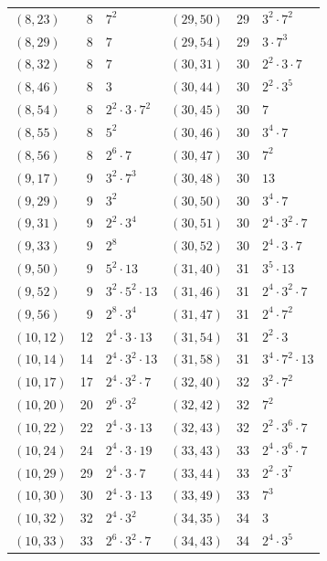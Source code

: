 \documentclass[11pt]{article}
\begin{document}
\begin{longtable}{@{}lrl@{\qquad}lrl@{}}
$(8,23)$ & 8 & $7^{2}$ & $(29,50)$ & 29 & $3^{2}\cdot 7^{2}$\\
$(8,29)$ & 8 & $7$ & $(29,54)$ & 29 & $3\cdot 7^{3}$\\
$(8,32)$ & 8 & $7$ & $(30,31)$ & 30 & $2^{2}\cdot 3\cdot 7$\\
$(8,46)$ & 8 & $3$ & $(30,44)$ & 30 & $2^{2}\cdot 3^{5}$\\
$(8,54)$ & 8 & $2^{2}\cdot 3\cdot 7^{2}$ & $(30,45)$ & 30 & $7$\\
$(8,55)$ & 8 & $5^{2}$ & $(30,46)$ & 30 & $3^{4}\cdot 7$\\
$(8,56)$ & 8 & $2^{6}\cdot 7$ & $(30,47)$ & 30 & $7^{2}$\\
$(9,17)$ & 9 & $3^{2}\cdot 7^{3}$ & $(30,48)$ & 30 & $13$\\
$(9,29)$ & 9 & $3^{2}$ & $(30,50)$ & 30 & $3^{4}\cdot 7$\\
$(9,31)$ & 9 & $2^{2}\cdot 3^{4}$ & $(30,51)$ & 30 & $2^{4}\cdot 3^{2}\cdot 7$\\
$(9,33)$ & 9 & $2^{8}$ & $(30,52)$ & 30 & $2^{4}\cdot 3\cdot 7$\\
$(9,50)$ & 9 & $5^{2}\cdot 13$ & $(31,40)$ & 31 & $3^{5}\cdot 13$\\
$(9,52)$ & 9 & $3^{2}\cdot 5^{2}\cdot 13$ & $(31,46)$ & 31 & $2^{4}\cdot 3^{2}\cdot 7$\\
$(9,56)$ & 9 & $2^{8}\cdot 3^{4}$ & $(31,47)$ & 31 & $2^{4}\cdot 7^{2}$\\
$(10,12)$ & 12 & $2^{4}\cdot 3\cdot 13$ & $(31,54)$ & 31 & $2^{2}\cdot 3$\\
$(10,14)$ & 14 & $2^{4}\cdot 3^{2}\cdot 13$ & $(31,58)$ & 31 & $3^{4}\cdot 7^{2}\cdot 13$\\
$(10,17)$ & 17 & $2^{4}\cdot 3^{2}\cdot 7$ & $(32,40)$ & 32 & $3^{2}\cdot 7^{2}$\\
$(10,20)$ & 20 & $2^{6}\cdot 3^{2}$ & $(32,42)$ & 32 & $7^{2}$\\
$(10,22)$ & 22 & $2^{4}\cdot 3\cdot 13$ & $(32,43)$ & 32 & $2^{2}\cdot 3^{6}\cdot 7$\\
$(10,24)$ & 24 & $2^{4}\cdot 3\cdot 19$ & $(33,43)$ & 33 & $2^{4}\cdot 3^{6}\cdot 7$\\
$(10,29)$ & 29 & $2^{4}\cdot 3\cdot 7$ & $(33,44)$ & 33 & $2^{2}\cdot 3^{7}$\\
$(10,30)$ & 30 & $2^{4}\cdot 3\cdot 13$ & $(33,49)$ & 33 & $7^{3}$\\
$(10,32)$ & 32 & $2^{4}\cdot 3^{2}$ & $(34,35)$ & 34 & $3$\\
$(10,33)$ & 33 & $2^{6}\cdot 3^{2}\cdot 7$ & $(34,43)$ & 34 & $2^{4}\cdot 3^{5}$\\

\end{longtable}
\end{document}
